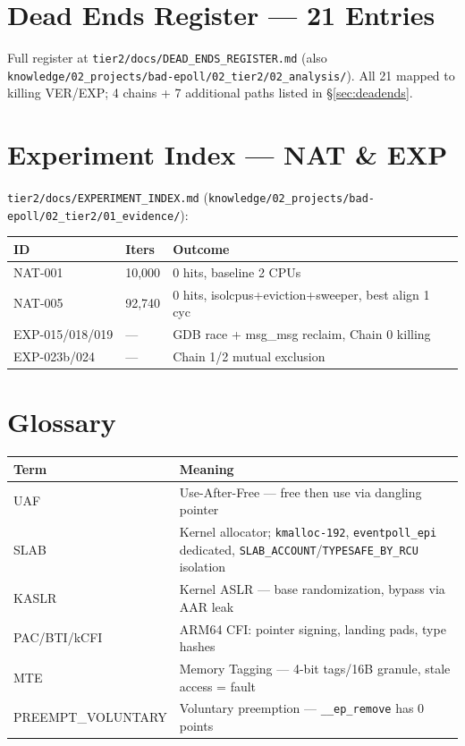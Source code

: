 \documentclass[11pt,a4paper]{article}
\begin{document}
\section{Dead Ends Register — 21 Entries}
\label{app:dead}
Full register at \texttt{tier2/docs/DEAD\_ENDS\_REGISTER.md} (also \texttt{knowledge/02\_projects/bad-epoll/02\_tier2/02\_analysis/}). All 21 mapped to killing VER/EXP; 4 chains + 7 additional paths listed in \S\ref{sec:deadends}.

\section{Experiment Index — NAT \& EXP}
\label{app:exp}
\texttt{tier2/docs/EXPERIMENT\_INDEX.md} (\texttt{knowledge/02\_projects/bad-epoll/02\_tier2/01\_evidence/}):

\begin{tabular}{lll}
\toprule
\textbf{ID} & \textbf{Iters} & \textbf{Outcome} \\
\midrule
NAT-001 & 10,000 & 0 hits, baseline 2 CPUs \\
NAT-005 & 92,740 & 0 hits, isolcpus+eviction+sweeper, best align 1 cyc \\
EXP-015/018/019 & — & GDB race + msg\_msg reclaim, Chain 0 killing \\
EXP-023b/024 & — & Chain 1/2 mutual exclusion \\
\bottomrule
\end{tabular}

\section{Glossary}
\label{app:gloss}
\begin{tabular}{lp{11cm}}
\toprule
\textbf{Term} & \textbf{Meaning} \\
\midrule
UAF & Use-After-Free — free then use via dangling pointer \\
SLAB & Kernel allocator; \texttt{kmalloc-192}, \texttt{eventpoll\_epi} dedicated, \texttt{SLAB\_ACCOUNT}/\texttt{TYPESAFE\_BY\_RCU} isolation \\
KASLR & Kernel ASLR — base randomization, bypass via AAR leak \\
PAC/BTI/kCFI & ARM64 CFI: pointer signing, landing pads, type hashes \\
MTE & Memory Tagging — 4-bit tags/16B granule, stale access = fault \\
PREEMPT\_VOLUNTARY & Voluntary preemption — \texttt{\_\_ep\_remove} has 0 points \\
\bottomrule
\end{tabular}
\end{document}
